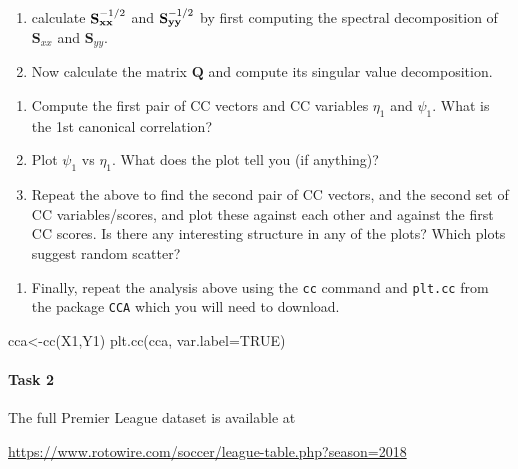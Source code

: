 \documentclass[
]{book}
\newenvironment{Shaded}{\begin{snugshade}}{\end{snugshade}}
\newcommand{\AttributeTok}[1]{\textcolor[rgb]{0.77,0.63,0.00}{#1}}
\newcommand{\ConstantTok}[1]{\textcolor[rgb]{0.00,0.00,0.00}{#1}}
\newcommand{\FunctionTok}[1]{\textcolor[rgb]{0.00,0.00,0.00}{#1}}
\newcommand{\NormalTok}[1]{#1}
\newcommand{\OtherTok}[1]{\textcolor[rgb]{0.56,0.35,0.01}{#1}}
\providecommand{\tightlist}{%
  \setlength{\itemsep}{0pt}\setlength{\parskip}{0pt}}
\theoremstyle{definition}
\theoremstyle{definition}
\theoremstyle{definition}
\theoremstyle{definition}
\theoremstyle{remark}
\begin{document}
\begin{enumerate}
\def\labelenumi{\roman{enumi}.}
\item
  calculate \({\bf S}_{\bf x x}^{-1/2}\) and \({\bf S}_{\bf yy}^{-1/2}\) by first computing the spectral decomposition of \(\mathbf S_{xx}\) and \(\mathbf S_{yy}\).
\item
  Now calculate the matrix \(\mathbf Q\) and compute its singular value decomposition.
\end{enumerate}

\begin{enumerate}
\def\labelenumi{\roman{enumi}.}
\setcounter{enumi}{2}
\item
  Compute the first pair of CC vectors and CC variables \(\eta_1\) and \(\psi_1\). What is the 1st canonical correlation?
\item
  Plot \(\psi_1\) vs \(\eta_1\). What does the plot tell you (if anything)?
\item
  Repeat the above to find the second pair of CC vectors, and the second set of CC variables/scores, and plot these against each other and against the first CC scores. Is there any interesting structure in any of the plots? Which plots suggest random scatter?
\end{enumerate}

\begin{enumerate}
\def\labelenumi{\roman{enumi}.}
\setcounter{enumi}{5}
\tightlist
\item
  Finally, repeat the analysis above using the \texttt{cc} command and \texttt{plt.cc} from the package \texttt{CCA} which you will need to download.
\end{enumerate}

\begin{Shaded}
\begin{Highlighting}[]
\NormalTok{cca}\OtherTok{\textless{}{-}}\FunctionTok{cc}\NormalTok{(X1,Y1)}
\FunctionTok{plt.cc}\NormalTok{(cca, }\AttributeTok{var.label=}\ConstantTok{TRUE}\NormalTok{)}
\end{Highlighting}
\end{Shaded}

\hypertarget{task-2}{%
\paragraph*{Task 2}\label{task-2}}

The full Premier League dataset is available at

\href{https://www.rotowire.com/soccer/league-table.php?season=2019}{https://www.rotowire.com/soccer/league-table.php?season=2018}
\end{document}
